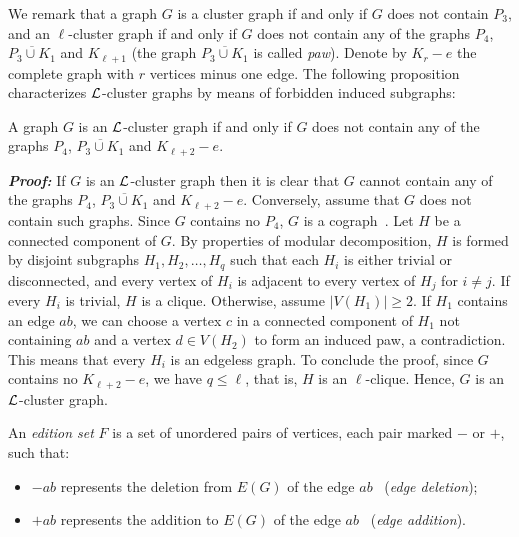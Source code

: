 \documentclass[12pt]{article}
\def\qed{ \fbox \par \medskip }
\def\qed2{ \hfill \framebox[.09in] \par \bigskip }
\def\L{{\cal L}}
\begin{document}
We remark that a graph $G$ is a cluster graph if and only if $G$ does not contain $P_3$,
and an $\ell$-cluster graph if and only if $G$ does not contain any of the graphs
$P_4$, $\overline{P_3 \cup K_1}$ and $K_{\ell+1}$ (the graph $\overline{P_3 \cup K_1}$
is called {\em paw}). Denote by $K_r-e$ the complete graph with $r$ vertices minus one edge.
The following proposition characterizes $\L$-cluster graphs by means of forbidden induced subgraphs:

\begin{prop} \label{forbidden}
A graph $G$ is an $\L$-cluster graph if and only if $G$ does
not contain any of the graphs $P_4$, $\overline{P_3 \cup K_1}$ and $K_{\ell+2}-e$.
\end{prop}



\noindent
\emph{\textbf{Proof:}} If $G$ is an $\L$-cluster graph then it is clear that $G$ cannot contain
any of the graphs $P_4$, $\overline{P_3 \cup K_1}$ and $K_{\ell+2}-e$. Conversely, assume that
$G$ does not contain such graphs. Since $G$ contains no $P_4$,
$G$ is a cograph~\cite{CLB81}. Let $H$ be a connected component of $G$. By properties of modular decomposition, $H$ is formed
by disjoint subgraphs $H_1, H_2, \ldots, H_q$ such that each $H_i$ is either trivial or disconnected,
and every vertex of $H_i$ is adjacent to every vertex of $H_j$ for $i \neq j$.
If every $H_i$ is trivial, $H$ is a clique. Otherwise, assume $|V(H_1)| \geq 2$. If $H_1$ contains an
edge $ab$, we can choose a vertex $c$ in a connected component of $H_1$ not containing $ab$ and a vertex $d \in V(H_2)$
to form an induced paw, a contradiction. This means that every $H_i$ is an edgeless graph. To conclude the proof,
since $G$ contains no $K_{\ell+2}-e$,  we have $q \leq \ell$, that is, $H$ is an $\ell$-clique. Hence,
$G$ is an $\L$-cluster graph.  \qed2

An \emph{edition set} $F$ is a set of unordered pairs of
vertices, each pair marked $-$ or $+$, such that:

\begin{itemize}

\item $-ab$ represents the deletion from $E(G)$ of the edge $ab$ \ ({\em edge deletion});

\item $+ab$ represents the addition to $E(G)$ of the edge $ab$ \ ({\em edge addition}).

\end{itemize}
\end{document}
